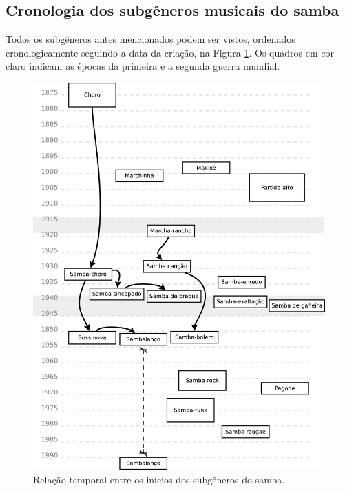 \subsection{Cronologia dos subgêneros musicais do samba}
Todos os subgêneros antes mencionados podem ser vistos, ordenados cronologicamente 
seguindo a data da criação, na Figura \ref{fig:sambamusicatimeline1}. 
Os quadros em cor claro indicam as épocas da primeira e a segunda guerra mundial.

\clearpage
\begin{figure}[H]
  \centering
    \includegraphics[width=1.0\textwidth]{chapters/cap-historia-musicasamba/musicatimeline.eps}
  \caption{Relação temporal entre os inícios dos subgêneros do samba.}
\label{fig:sambamusicatimeline1}
\end{figure}


